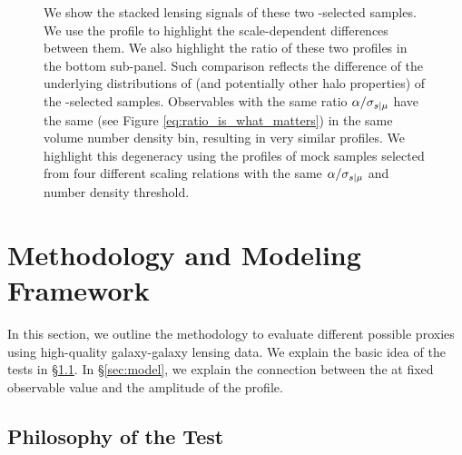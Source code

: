 \documentclass[fleqn,usenatbib,useAMS,english]{mnras}
\begin{document}
\begin{figure}
{            We show the stacked lensing signals of these two \topn{}-selected samples.
            We use the \rdsigma{} profile to highlight the scale-dependent differences between them.
            We also highlight the ratio of these two profiles in the bottom sub-panel.
            Such comparison reflects the difference of the underlying distributions of \mhalo{}
            (and potentially other halo properties) of the \topn{}-selected samples.
            Observables with the same ratio $\alpha / \sigma_{s{} | \mu{}}$ have the same
            \scatterMhaloObsSym{} (see Figure \ref{eq:ratio_is_what_matters}) in the same volume
            number density bin, resulting in very similar \dsigma{} profiles.
            We highlight this degeneracy using the \rdsigma{} profiles of mock samples selected from
            four different scaling relations with the same $\alpha / \sigma_{s{} | \mu{}}$ and number
            density threshold.
        }
        \label{fig:theory_1}
    \end{figure}


\section{Methodology and Modeling Framework}
    \label{sec:method}

    In this section, we outline the methodology to evaluate different possible \mvir{}
    proxies using high-quality galaxy-galaxy lensing data.
    We explain the basic idea of the \topn{} tests in \S \ref{sec:topn_intro}.
    In \S \ref{sec:model}, we explain the connection between the \sigmh{} at
    fixed observable value and the amplitude of the \dsigma{} profile.

\subsection{Philosophy of the \topn{} Test}
    \label{sec:topn_intro}
\end{document}
